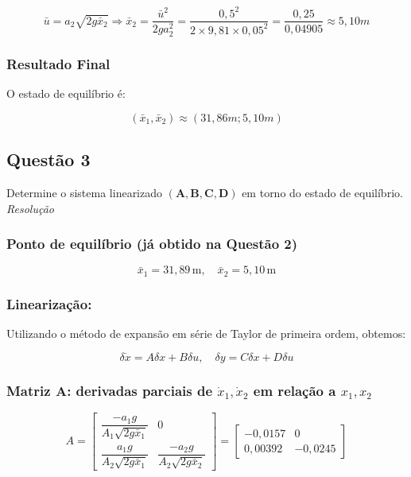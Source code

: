 \documentclass[12pt,a4]{article}
\begin{document}
     \begin{equation}
    \bar{u} =  a_2 \sqrt{2g \bar{x}_2} \Longrightarrow \bar{x}_2 = \frac{\bar{u}^2}{2ga_2^2} = \frac{0,5^2}{2 \times 9,81 \times 0,05^2} = \frac{0,25}{0,04905} \approx 5,10m
    \end{equation}

    \subsubsection{Resultado Final}

    O estado de equilíbrio é:

     \begin{equation}
    (\bar{x}_1, \bar{x}_2) \approx (31,86m; 5,10m)
    \end{equation}
    
\subsection{Questão 3}
    Determine o sistema linearizado $ (\mathbf{A,B,C,D}) $ em torno do estado de equilíbrio.\\
    \textit{Resolução}

    \subsubsection*{Ponto de equilíbrio (já obtido na Questão 2)}
    \begin{equation}
\bar{x}_1 = 31{,}89 \, \text{m}, \quad \bar{x}_2 = 5{,}10 \, \text{m}
    \end{equation}
\subsubsection*{Linearização:}
Utilizando o método de expansão em série de Taylor de primeira ordem, obtemos:

 \begin{equation}
\delta \dot{x} = A \delta x + B \delta u, \quad \delta y = C \delta x + D \delta u
 \end{equation}

\subsubsection*{Matriz A: derivadas parciais de \(\dot{x}_1, \dot{x}_2\) em relação a \(x_1, x_2\)}

\begin{equation}
A = \begin{bmatrix}
\dfrac{-a_1 g}{A_1 \sqrt{2g \bar{x}_1}} & 0 \\
\dfrac{a_1 g}{A_2 \sqrt{2g \bar{x}_1}} & \dfrac{-a_2 g}{A_2 \sqrt{2g \bar{x}_2}}
\end{bmatrix}
=
\begin{bmatrix}
-0{,}0157 & 0 \\
0{,}00392 & -0{,}0245
\end{bmatrix}
\end{equation}
\end{document}
